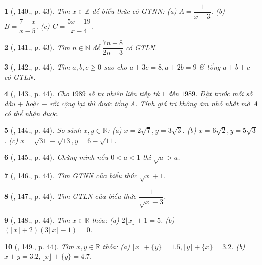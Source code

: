 \documentclass{article}
\newtheorem{baitoan}{}
\begin{document}
\begin{baitoan}[\cite{Binh_Toan_7_tap_1}, 140., p. 43]
	Tìm $x\in\mathbb{Z}$ để biểu thức có {\rm GTNN}: (a) $A = \dfrac{1}{x - 3}$. (b) $B = \dfrac{7 - x}{x - 5}$. (c) $C = \dfrac{5x - 19}{x - 4}$.
\end{baitoan}

\begin{baitoan}[\cite{Binh_Toan_7_tap_1}, 141., p. 43]
	Tìm $n\in\mathbb{N}$ để $\dfrac{7n - 8}{2n - 3}$ có {\rm GTLN}.
\end{baitoan}

\begin{baitoan}[\cite{Binh_Toan_7_tap_1}, 142., p. 44]
	Tìm $a,b,c\ge0$ sao cho $a + 3c = 8,a + 2b = 9$ \& tổng $a + b + c$ có {\rm GTLN}.
\end{baitoan}

\begin{baitoan}[\cite{Binh_Toan_7_tap_1}, 143., p. 44]
	Cho $1989$ số tự nhiên liên tiếp từ $1$ đến $1989$. Đặt trước mỗi số dấu $+$ hoặc $-$ rồi cộng lại thì được tổng A. Tính giá trị không âm nhỏ nhất mà A có thể nhận được.
\end{baitoan}

\begin{baitoan}[\cite{Binh_Toan_7_tap_1}, 144., p. 44]
	So sánh $x,y\in\mathbb{R}$: (a) $x = 2\sqrt{7},y = 3\sqrt{3}$. (b) $x = 6\sqrt{2},y = 5\sqrt{3}$. (c) $x  =\sqrt{31} - \sqrt{13},y = 6 - \sqrt{11}$.
\end{baitoan}

\begin{baitoan}[\cite{Binh_Toan_7_tap_1}, 145., p. 44]
	Chứng minh nếu $0 < a < 1$ thì $\sqrt{a} > a$.
\end{baitoan}

\begin{baitoan}[\cite{Binh_Toan_7_tap_1}, 146., p. 44]
	Tìm {\rm GTNN} của biểu thức $\sqrt{x} + 1$.
\end{baitoan}

\begin{baitoan}[\cite{Binh_Toan_7_tap_1}, 147., p. 44]
	Tìm {\rm GTLN} của biểu thức $\dfrac{1}{\sqrt{x} + 3}$.
\end{baitoan}

\begin{baitoan}[\cite{Binh_Toan_7_tap_1}, 148., p. 44]
	Tìm $x\in\mathbb{R}$ thỏa: (a) $2\lfloor x\rfloor + 1 = 5$. (b) $(\lfloor x\rfloor + 2)(3\lfloor x\rfloor - 1) = 0$.
\end{baitoan}

\begin{baitoan}[\cite{Binh_Toan_7_tap_1}, 149., p. 44]
	Tìm $x,y\in\mathbb{R}$ thỏa: (a) $\lfloor x\rfloor + \{y\} = 1.5,\lfloor y\rfloor + \{x\} = 3.2$. (b) $x + y = 3.2,\lfloor x\rfloor + \{y\} = 4.7$.
\end{baitoan}
\end{document}
